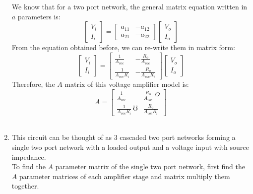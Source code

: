 \begin{enumerate}
{	We know that for a two port network, the general matrix
	equation written in $a$ parameters is:
	$$ \left[ \begin{matrix}
	V_i \\ 
	I_i
	\end{matrix}\right] = \left[ \begin{matrix}
	a_{11} & -a_{12} \\ 
	a_{21} & -a_{22}
	\end{matrix}  \right] \left[ \begin{matrix}
	V_o \\ 
	I_o
	\end{matrix}  \right]  $$	
	From the equation obtained before, we can re-write them in matrix form:
	$$ \left[ \begin{matrix}
	V_i \\ 
	I_i
	\end{matrix}\right] = \left[ \begin{matrix}
	\frac{1}{A_{voc}} 		& -\frac{R_o}{A_{voc}} \\[6pt] 
	\frac{1}{A_{voc}R_i}	& -\frac{R_o}{A_{voc}R_i}
	\end{matrix}  \right] \left[ \begin{matrix}
	V_o \\ 
	I_o
	\end{matrix}  \right]  $$	
	}
	Therefore, the $A$ matrix of this voltage amplifier model is:
	$$ A = 
	\left[ \begin{matrix}
	\frac{1}{A_{voc}} 		& \frac{R_o}{A_{voc}} \, \Omega \\[6pt] 
	\frac{1}{A_{voc}R_i} \, \mho	& \frac{R_o}{A_{voc}R_i}
	\end{matrix}  \right] $$
	\\
	
	\item{
	This circuit can be thought of as 3 cascaded two port networks forming 
	a single two port network with a loaded output and a voltage input with 
	source impedance.\\
	To find the $A$ parameter matrix of the single two port network, first 
	find the $A$ parameter matrices of each amplifier stage and matrix 
	multiply them together.
	
}
\end{enumerate}
